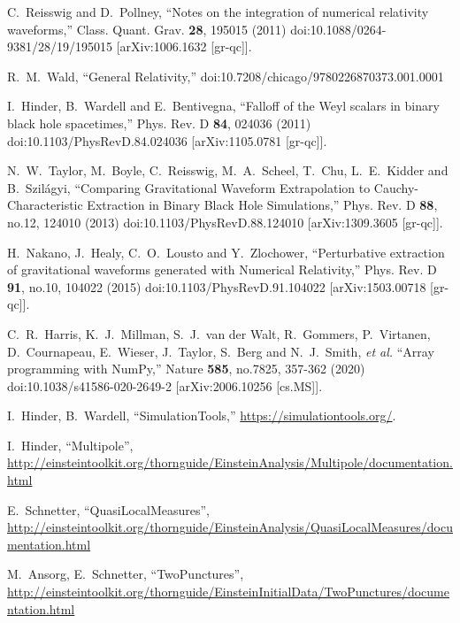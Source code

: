 \begin{thebibliography}{9}
C.~Reisswig and D.~Pollney,
``Notes on the integration of numerical relativity waveforms,''
Class. Quant. Grav. \textbf{28}, 195015 (2011)
doi:10.1088/0264-9381/28/19/195015
[arXiv:1006.1632 [gr-qc]].

R.~M.~Wald,
``General Relativity,''
doi:10.7208/chicago/9780226870373.001.0001

I.~Hinder, B.~Wardell and E.~Bentivegna,
``Falloff of the Weyl scalars in binary black hole spacetimes,''
Phys. Rev. D \textbf{84}, 024036 (2011)
doi:10.1103/PhysRevD.84.024036
[arXiv:1105.0781 [gr-qc]].

N.~W.~Taylor, M.~Boyle, C.~Reisswig, M.~A.~Scheel, T.~Chu, L.~E.~Kidder and
B.~Szil\'agyi,
``Comparing Gravitational Waveform Extrapolation to Cauchy-Characteristic
Extraction in Binary Black Hole Simulations,''
Phys. Rev. D \textbf{88}, no.12, 124010 (2013)
doi:10.1103/PhysRevD.88.124010
[arXiv:1309.3605 [gr-qc]].

H.~Nakano, J.~Healy, C.~O.~Lousto and Y.~Zlochower,
``Perturbative extraction of gravitational waveforms generated with Numerical
Relativity,''
Phys. Rev. D \textbf{91}, no.10, 104022 (2015)
doi:10.1103/PhysRevD.91.104022
[arXiv:1503.00718 [gr-qc]].

C.~R.~Harris, K.~J.~Millman, S.~J.~van der Walt, R.~Gommers, P.~Virtanen, D.~Cournapeau, E.~Wieser, J.~Taylor, S.~Berg and N.~J.~Smith, \textit{et al.}
``Array programming with NumPy,''
Nature \textbf{585}, no.7825, 357-362 (2020)
doi:10.1038/s41586-020-2649-2
[arXiv:2006.10256 [cs.MS]].

I.~Hinder, B.~Wardell,
``SimulationTools,''
\url{https://simulationtools.org/}.

I.~Hinder,
``Multipole'',
\url{http://einsteintoolkit.org/thornguide/EinsteinAnalysis/Multipole/documentation.html}

E.~Schnetter,
``QuasiLocalMeasures'',
\url{http://einsteintoolkit.org/thornguide/EinsteinAnalysis/QuasiLocalMeasures/documentation.html}

M.~Ansorg, E.~Schnetter,
``TwoPunctures'',
\url{http://einsteintoolkit.org/thornguide/EinsteinInitialData/TwoPunctures/documentation.html}


\end{thebibliography}
